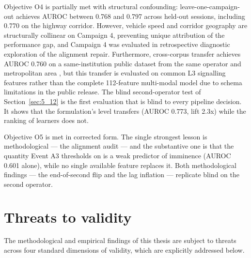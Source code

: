 Objective O4 is partially met with structural confounding: leave-one-campaign-out achieves AUROC between 0.768 and 0.797 across held-out sessions, including 0.770 on the highway corridor. However, vehicle speed and corridor geography are structurally collinear on Campaign 4, preventing unique attribution of the performance gap, and Campaign 4 was evaluated in retrospective diagnostic exploration of the alignment repair. Furthermore, cross-corpus transfer achieves AUROC 0.760 on a same-institution public dataset from the same operator and metropolitan area \cite{ref38}, but this transfer is evaluated on common L3 signalling features rather than the complete 112-feature multi-modal model due to schema limitations in the public release. The blind second-operator test of Section~\ref{sec:5_12} is the first evaluation that is blind to every pipeline decision. It shows that the formulation's level transfers (AUROC 0.773, lift 2.3x) while the ranking of learners does not.

Objective O5 is met in corrected form. The single strongest lesson is methodological --- the alignment audit --- and the substantive one is that the quantity Event A3 thresholds on is a weak predictor of imminence (AUROC 0.601 alone), while no single available feature replaces it. Both methodological findings --- the end-of-second flip and the lag inflation --- replicate blind on the second operator.


\section{Threats to validity}
\label{sec:5_14}

The methodological and empirical findings of this thesis are subject to threats across four standard dimensions of validity, which are explicitly addressed below.

